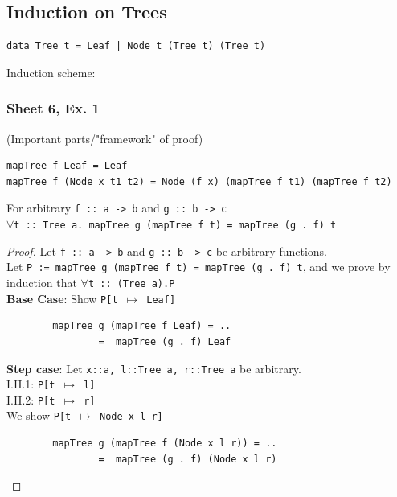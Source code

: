 \documentclass{article}
\begin{document}
\subsection{Induction on Trees}
\begin{verbatim}
data Tree t = Leaf | Node t (Tree t) (Tree t)
\end{verbatim}

Induction scheme:
\begin{prooftree}
\end{prooftree}

\subsubsection{Sheet 6, Ex. 1}
(Important parts/"framework" of proof) 
\begin{verbatim}
mapTree f Leaf = Leaf
mapTree f (Node x t1 t2) = Node (f x) (mapTree f t1) (mapTree f t2) 
\end{verbatim}  
For arbitrary \texttt{f :: a -> b} and \texttt{g :: b -> c} \\
$\forall$\texttt{t :: Tree a. mapTree g (mapTree f t) = mapTree (g . f) t}

\begin{proof}
    Let \texttt{f :: a -> b} and \texttt{g :: b -> c} be arbitrary functions. \\
    Let \texttt{P := mapTree g (mapTree f t) = mapTree (g . f) t}, and we prove by induction that 
    $\forall$\texttt{t :: (Tree a).P} \\
    \textbf{Base Case}: Show \texttt{P[t $\mapsto$ Leaf]} 
    \begin{verbatim}
        mapTree g (mapTree f Leaf) = ..
                =  mapTree (g . f) Leaf
    \end{verbatim}
    \textbf{Step case}: 
    Let \texttt{x::a, l::Tree a, r::Tree a} be arbitrary. \\
    I.H.1: \texttt{P[t $\mapsto$ l]} \\
    I.H.2: \texttt{P[t $\mapsto$ r]} \\
    We show \texttt{P[t $\mapsto$ Node x l r]} 
    \begin{verbatim}
        mapTree g (mapTree f (Node x l r)) = ..
                =  mapTree (g . f) (Node x l r)
    \end{verbatim}
\end{proof}
\end{document}
